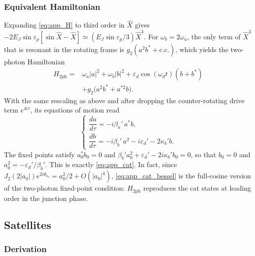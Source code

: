 \documentclass[aps,prx,reprint,floatfix,amsmath,amssymb,longbibliography]{revtex4-2}
\begin{document}
\subsubsection{Equivalent Hamiltonian}
\label{app:cat_hamiltonian}

Expanding \cref{eq:app_H} to third order in $\hat X$ gives $-2E_J\sin\varepsilon_p[\sin\hat X-\hat X]\simeq (E_J\sin\varepsilon_p/3)\hat X^3$. For $\omega_b=2\omega_a$, the only term of $\hat X^3$ that is resonant in the rotating frame is $g_2(a^2b^*+\text{c.c.})$, which yields the two-photon Hamiltonian
\begin{equation}
\begin{split}
    H_\text{2ph} = {}& \omega_a|a|^2 + \omega_b|b|^2 + \varepsilon_d\cos(\omega_d t)(b+b^*)\\
    &+ g_2\bigl(a^2 b^* + a^{*2} b\bigr).
\end{split}
\end{equation}
With the same rescaling as above and after dropping the counter-rotating drive term $e^{4i\tau}$, its equations of motion read
\begin{equation}
\begin{cases}
    \dfrac{da}{d\tau} = -i\beta_a'\, a^* b,\\[2mm]
    \dfrac{db}{d\tau} = -i\beta_b'\, a^2 - i\varepsilon_d' - 2\kappa_b' b.
\end{cases}
\end{equation}
The fixed points satisfy $a_0^*b_0=0$ and $\beta_b'a_0^2+\varepsilon_d'-2i\kappa_b'b_0=0$, so that $b_0=0$ and $a_0^2=-\varepsilon_d'/\beta_b'$. This is exactly \cref{eq:app_cat}. In fact, since $J_2(2|a_0|)e^{2i\theta_{a_0}}=a_0^2/2+O(|a_0|^4)$, \cref{eq:app_cat_bessel} is the full-cosine version of the two-photon fixed-point condition: $H_\text{2ph}$ reproduces the cat states at leading order in the junction phase.

\subsection{Satellites}
\label{app:satellites}

\subsubsection{Derivation}
\label{app:sat_derivation}
\end{document}
